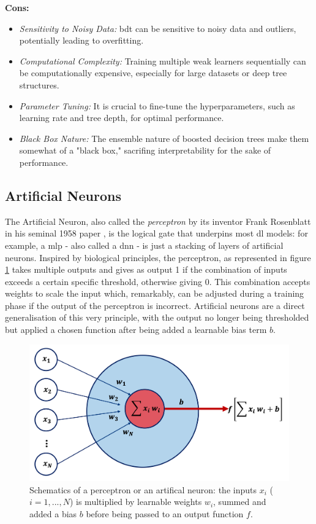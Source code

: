\textbf{Cons:}
\begin{itemize}
    \item \textit{Sensitivity to Noisy Data:} \gls{bdt} can be sensitive to noisy data and outliers, potentially leading to overfitting.
    \item \textit{Computational Complexity:} Training multiple weak learners sequentially can be computationally expensive, especially for large datasets or deep tree structures.
    \item \textit{Parameter Tuning:} It is crucial to fine-tune the hyperparameters, such as learning rate and tree depth, for optimal performance.
    \item \textit{Black Box Nature:} The ensemble nature of boosted decision trees make them somewhat of a "black box,"  sacrifing interpretability for the sake of performance.
\end{itemize}

\subsection{Artificial Neurons}
The Artificial Neuron, also called the \textit{perceptron} by its inventor Frank Rosenblatt in his seminal 1958 paper \cite{rosenblatt1958perceptron}, is the logical gate that underpins most \gls{dl} models: for example, a \gls{mlp} - also called a \gls{dnn} - is just a stacking of layers of artificial neurons. Inspired by biological principles, the perceptron, as represented in figure \ref{fig:annModel} takes multiple outputs and gives as output 1 if the combination of inputs exceeds a certain specific threshold, otherwise giving 0. This combination accepts weights to scale the input which, remarkably, can be adjusted during a training phase if the output of the perceptron is incorrect. Artificial neurons are a direct generalisation of this very principle, with the output no longer being thresholded but applied a chosen function after being added a learnable bias term $b$. 

\begin{figure}[h!]
    \center
    \includegraphics[scale=0.4]{Images/ML/ann.png}
    \caption{Schematics of a perceptron or an artifical neuron: the inputs $x_i$ ($i= 1, ..., N$) is multiplied by learnable weights $w_i$, summed and added a bias $b$ before being passed to an output function $f$.} 
    \label{fig:annModel}
\end{figure}

